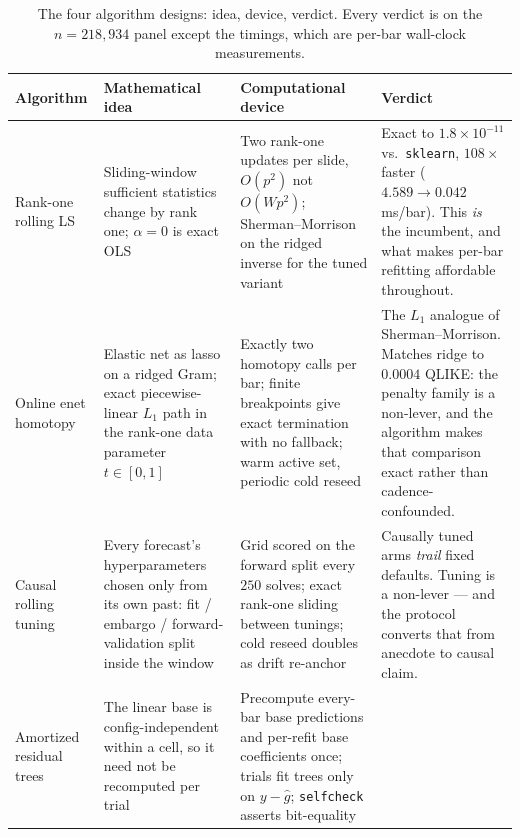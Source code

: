 \begin{table}[H]
\centering
\footnotesize
\setlength{\tabcolsep}{4pt}
\caption{The four algorithm designs: idea, device, verdict. Every verdict is on the
$n = 218{,}934$ panel except the timings, which are per-bar wall-clock
measurements.}
\label{tab:alg_synthesis}
\begin{tabular}{p{2.2cm} p{3.3cm} p{3.4cm} p{4.6cm}}
\toprule
Algorithm & Mathematical idea & Computational device & Verdict \\
\midrule
Rank-one rolling LS
& Sliding-window sufficient statistics change by rank one; $\alpha = 0$ is exact OLS
& Two rank-one updates per slide, $O(p^2)$ not $O(Wp^2)$; Sherman--Morrison on the ridged inverse for the tuned variant
& Exact to $1.8\times10^{-11}$ vs.\ \texttt{sklearn}, $108\times$ faster ($4.589 \to 0.042$ ms/bar). This \emph{is} the incumbent, and what makes per-bar refitting affordable throughout. \\
\addlinespace
Online enet homotopy
& Elastic net as lasso on a ridged Gram; exact piecewise-linear $L_1$ path in the rank-one data parameter $t \in [0,1]$
& Exactly two homotopy calls per bar; finite breakpoints give exact termination with no fallback; warm active set, periodic cold reseed
& The $L_1$ analogue of Sherman--Morrison. Matches ridge to $0.0004$ QLIKE: the penalty family is a non-lever, and the algorithm makes that comparison exact rather than cadence-confounded. \\
\addlinespace
Causal rolling tuning
& Every forecast's hyperparameters chosen only from its own past: fit / embargo / forward-validation split inside the window
& Grid scored on the forward split every $250$ solves; exact rank-one sliding between tunings; cold reseed doubles as drift re-anchor
& Causally tuned arms \emph{trail} fixed defaults. Tuning is a non-lever --- and the protocol converts that from anecdote to causal claim. \\
\addlinespace
Amortized residual trees
& The linear base is config-independent within a cell, so it need not be recomputed per trial
& Precompute every-bar base predictions and per-refit base coefficients once; trials fit trees only on $y - \hat{g}$; \texttt{selfcheck} asserts bit-equality

\end{tabular}
\end{table}
